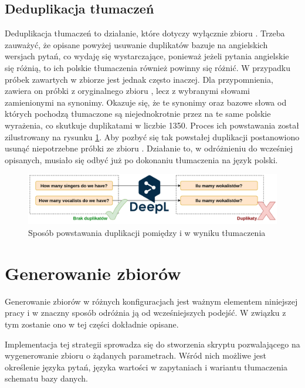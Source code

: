 \subsection{Deduplikacja tłumaczeń}
Deduplikacja tłumaczeń to działanie, które dotyczy wyłącznie zbioru . Trzeba zauważyć, że opisane powyżej usuwanie duplikatów bazuje na angielskich wersjach pytań, co wydaję się wystarczające, ponieważ jeżeli pytania angielskie się różnią, to ich polskie tłumaczenia również powinny się różnić. W przypadku próbek zawartych w zbiorze  jest jednak często inaczej. Dla przypomnienia, zawiera on próbki z oryginalnego zbioru , lecz z wybranymi słowami zamienionymi na synonimy. Okazuje się, że te synonimy oraz bazowe słowa od których pochodzą tłumaczone są niejednokrotnie przez  na te same polskie wyrażenia, co skutkuje duplikatami w liczbie 1350. Proces ich powstawania został zilustrowany na rysunku \ref{fig:deduplication-after-translation}. Aby pozbyć się tak powstałej duplikacji postanowiono usunąć niepotrzebne próbki ze zbioru . Działanie to, w odróżnieniu do wcześniej opisanych, musiało się odbyć już po dokonaniu tłumaczenia na język polski.

\begin{figure}[ht!]
  \centering
  \includegraphics[width=1.0\linewidth]{images/duplication_after_translation.png}
  \caption{Sposób powstawania duplikacji pomiędzy  i  w wyniku tłumaczenia}
  \label{fig:deduplication-after-translation}
\end{figure}

\section{Generowanie zbiorów}
Generowanie zbiorów w różnych konfiguracjach jest ważnym elementem niniejszej pracy i w znaczny sposób odróżnia ją od wcześniejszych podejść. W związku z tym zostanie ono w tej części dokładnie opisane.

Implementacja tej strategii sprowadza się do stworzenia skryptu pozwalającego na wygenerowanie zbioru o żądanych parametrach. Wśród nich możliwe jest określenie języka pytań, języka wartości w zapytaniach i wariantu tłumaczenia schematu bazy danych.


